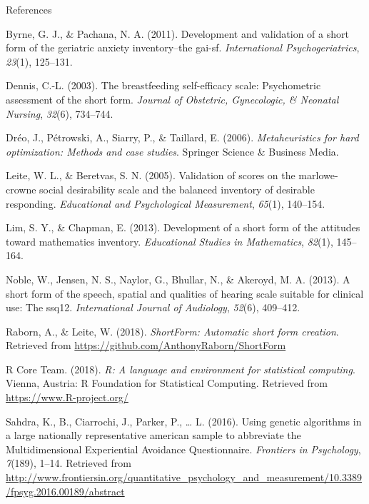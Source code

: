 \documentclass[ignorenonframetext,]{beamer}
\begin{document}
\begin{frame}[allowframebreaks]{References}
\protect\hypertarget{references-1}{}

\tiny

\hypertarget{refs}{}
\leavevmode\hypertarget{ref-byrne2011development}{}%
Byrne, G. J., \& Pachana, N. A. (2011). Development and validation of a
short form of the geriatric anxiety inventory--the gai-sf.
\emph{International Psychogeriatrics}, \emph{23}(1), 125--131.

\leavevmode\hypertarget{ref-dennis2003breastfeeding}{}%
Dennis, C.-L. (2003). The breastfeeding self-efficacy scale:
Psychometric assessment of the short form. \emph{Journal of Obstetric,
Gynecologic, \& Neonatal Nursing}, \emph{32}(6), 734--744.

\leavevmode\hypertarget{ref-dreo2006metaheuristics}{}%
Dréo, J., Pétrowski, A., Siarry, P., \& Taillard, E. (2006).
\emph{Metaheuristics for hard optimization: Methods and case studies}.
Springer Science \& Business Media.

\leavevmode\hypertarget{ref-leite2005validation}{}%
Leite, W. L., \& Beretvas, S. N. (2005). Validation of scores on the
marlowe-crowne social desirability scale and the balanced inventory of
desirable responding. \emph{Educational and Psychological Measurement},
\emph{65}(1), 140--154.

\leavevmode\hypertarget{ref-lim2013development}{}%
Lim, S. Y., \& Chapman, E. (2013). Development of a short form of the
attitudes toward mathematics inventory. \emph{Educational Studies in
Mathematics}, \emph{82}(1), 145--164.

\leavevmode\hypertarget{ref-noble2013short}{}%
Noble, W., Jensen, N. S., Naylor, G., Bhullar, N., \& Akeroyd, M. A.
(2013). A short form of the speech, spatial and qualities of hearing
scale suitable for clinical use: The ssq12. \emph{International Journal
of Audiology}, \emph{52}(6), 409--412.

\leavevmode\hypertarget{ref-Raborn2018}{}%
Raborn, A., \& Leite, W. (2018). \emph{ShortForm: Automatic short form
creation}. Retrieved from
\url{https://github.com/AnthonyRaborn/ShortForm}

\leavevmode\hypertarget{ref-RCT2018}{}%
R Core Team. (2018). \emph{R: A language and environment for statistical
computing}. Vienna, Austria: R Foundation for Statistical Computing.
Retrieved from \url{https://www.R-project.org/}

\leavevmode\hypertarget{ref-Sahdra2016}{}%
Sahdra, K., B., Ciarrochi, J., Parker, P., \ldots{} L. (2016). Using
genetic algorithms in a large nationally representative american sample
to abbreviate the Multidimensional Experiential Avoidance Questionnaire.
\emph{Frontiers in Psychology}, \emph{7}(189), 1--14. Retrieved from
\url{http://www.frontiersin.org/quantitative_psychology_and_measurement/10.3389/fpsyg.2016.00189/abstract}


\end{frame}
\end{document}
